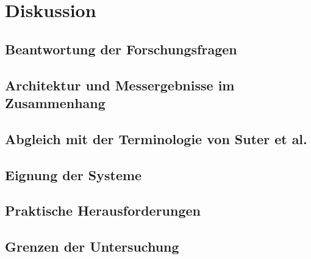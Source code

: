 
\chapter{Diskussion}
\label{sec:diskussion}

\section{Beantwortung der Forschungsfragen}
\label{sec:diskussion:fragen}

\section{Architektur und Messergebnisse im Zusammenhang}
\label{sec:diskussion:architektur}

\section{Abgleich mit der Terminologie von Suter et al.}
\label{sec:diskussion:suter}

\section{Eignung der Systeme}
\label{sec:diskussion:eignung}

\section{Praktische Herausforderungen}
\label{sec:diskussion:herausforderungen}

\section{Grenzen der Untersuchung}
\label{sec:diskussion:grenzen}


